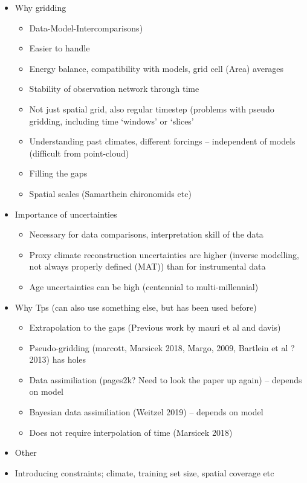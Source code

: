 \begin{refsection}
\begin{itemize}
	\item Why gridding
	\begin{itemize}
		\item Data-Model-Intercomparisons)
		\item Easier to handle
		\item Energy balance, compatibility with models, grid cell (Area) averages
		\item Stability of observation network through time
		\item Not just spatial grid, also regular timestep (problems with pseudo gridding, including time ‘windows’ or ‘slices’
		\item Understanding past climates, different forcings – independent of models (difficult from point-cloud)
		\item Filling the gaps
		\item Spatial scales (Samarthein chironomids etc)
	\end{itemize}
	\item Importance of uncertainties
	\begin{itemize}
		\item Necessary for data comparisons, interpretation skill of the data
		\item Proxy climate reconstruction uncertainties are higher (inverse modelling, not always properly defined (MAT)) than for instrumental data
		\item Age uncertainties can be high (centennial to multi-millennial)
	\end{itemize}
	\item Why Tps (can also use something else, but has been used before)
	\begin{itemize}
		\item Extrapolation to the gaps (Previous work by mauri et al and davis)
		\item Pseudo-gridding (marcott, Marsicek 2018, Margo, 2009, Bartlein et al ?2013) has holes
		\item Data assimiliation (pages2k? Need to look the paper up again) – depends on model
		\item Bayesian data assimiliation (Weitzel 2019) – depends on model
		\item Does not require interpolation of time (Marsicek 2018)
	\end{itemize}
	\item Other
	\item Introducing constraints; climate, training set size, spatial coverage etc
\end{itemize}


\end{refsection}
